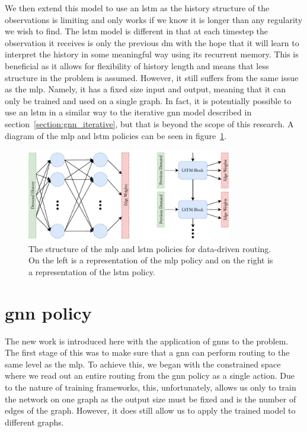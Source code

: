 We then extend this model to use an \acf{lstm}\cite{hochreiter1997long} as the history structure of the observations is limiting and only works if we know it is longer than any regularity we wish to find. The \ac{lstm} model is different in that at each timestep the observation it receives is only the previous \ac{dm} with the hope that it will learn to interpret the history in some meaningful way using its recurrent memory. This is beneficial as it allows for flexibility of history length and means that less structure in the problem is assumed. However, it still suffers from the same issue as the \ac{mlp}. Namely, it has a fixed size input and output, meaning that it can only be trained and used on a single graph. In fact, it is potentially possible to use an \ac{lstm} in a similar way to the iterative \ac{gnn} model described in section~\ref{section:gnn_iterative}, but that is beyond the scope of this research. A diagram of the \ac{mlp} and \ac{lstm} policies can be seen in figure~\ref{fig:mlp_lstm}.

\begin{figure}
    \centering
    \includegraphics[width=0.8\textwidth]{figures/mlp_lstm.pdf}
    \caption{The structure of the \ac{mlp} and \ac{lstm} policies for data-driven routing. On the left is a representation of the \ac{mlp} policy and on the right is a representation of the \ac{lstm} policy.}
    \label{fig:mlp_lstm}
\end{figure}


\section{\ac{gnn} policy}
\label{section:gnn_policy}
The new work is introduced here with the application of \acp{gnn} to the problem. The first stage of this was to make sure that a \ac{gnn} can perform routing to the same level as the \ac{mlp}. To achieve this, we began with the constrained space where we read out an entire routing from the \ac{gnn} policy as a single action. Due to the nature of training frameworks, this, unfortunately, allows us only to train the network on one graph as the output size must be fixed and is the number of edges of the graph. However, it does still allow us to apply the trained model to different graphs.

